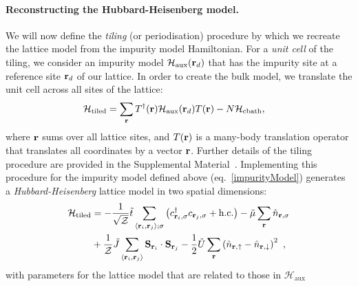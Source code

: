 \documentclass[%
 reprint,
superscriptaddress,
groupedaddress,
 amsmath,amssymb,
 aps,
prl
]{revtex4-2}
\begin{document}
\paragraph*{Reconstructing the Hubbard-Heisenberg model.} %
We will now define the {\it tiling} (or periodisation) procedure by which we recreate the lattice model 
from the 
impurity model Hamiltonian. 
For a {\it unit cell} 
of the tiling, 
we consider an impurity model \(\mathcal{H}_\text{aux}({\bf r}_d)\) that has the impurity site at a reference site \({\bf r}_d\) of our lattice. In order to create the bulk model, we translate the unit cell across all sites of the lattice:
\begin{equation}\begin{aligned}
	\label{tilingPrescription}
	\mathcal{H}_\text{tiled} &= \sum_{{\bf r}}T^\dagger({\bf r})\mathcal{H}_\text{aux}({\bf r}_d)T({\bf r}) - N\mathcal{H}_\text{cbath},
\end{aligned}\end{equation}
where \({\bf r}\) sums over all lattice sites, and $T({\bf r})$ is a many-body translation operator that translates all 
coordinates by a vector \({\bf r}\). Further details of the tiling procedure are provided in the Supplemental Material~\cite{suppmat}.
Implementing this procedure for the impurity model defined above (eq.~\ref{impurityModel}) generates a {\it Hubbard-Heisenberg} lattice model in two spatial dimensions:
\begin{equation}\begin{aligned}
		\mathcal{H}_\text{tiled} &= -\frac{1}{\sqrt\mathcal{Z}}\tilde t\sum_{\left<{\bf r}_i, {\bf r}_j\right>;\sigma}\left(c^\dagger_{{\bf r}_i,\sigma}c_{{\bf r}_j,\sigma} + \text{h.c.}\right) - \tilde \mu \sum_{{\bf r}}\hat n_{{\bf r},\sigma} \\
        &+ \frac{1}{\mathcal{Z}}\tilde J\sum_{\left< {\bf r}_i, {\bf r}_j\right>}{\bf S}_{{\bf r}_i}\cdot{\bf S}_{{\bf r}_j} - \frac{1}{2}\tilde U\sum_{\bf r}\left(\hat n_{{\bf r} , \uparrow} - \hat n_{{\bf r} , \downarrow}\right)^2  ~,
\end{aligned}\end{equation}
with parameters for the lattice model that are related to those in $\mathcal{H}_\text{aux}$
\end{document}
